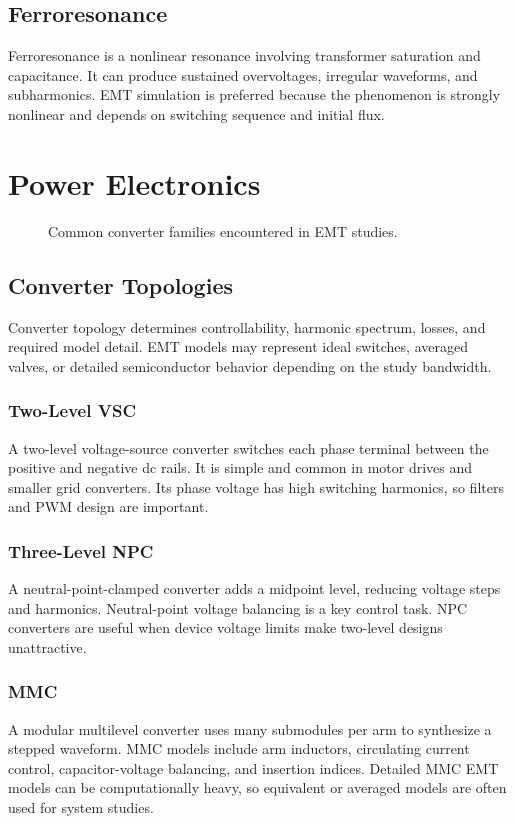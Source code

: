 \documentclass[11pt]{article}
\begin{document}
\subsection{Ferroresonance}
Ferroresonance is a nonlinear resonance involving transformer saturation and capacitance. It can produce sustained overvoltages, irregular waveforms, and subharmonics. EMT simulation is preferred because the phenomenon is strongly nonlinear and depends on switching sequence and initial flux.

\section{Power Electronics}
\begin{figure}[h]
\centering

\caption{Common converter families encountered in EMT studies.}
\end{figure}

\subsection{Converter Topologies}
Converter topology determines controllability, harmonic spectrum, losses, and required model detail. EMT models may represent ideal switches, averaged valves, or detailed semiconductor behavior depending on the study bandwidth.

\subsubsection{Two-Level VSC}
A two-level voltage-source converter switches each phase terminal between the positive and negative dc rails. It is simple and common in motor drives and smaller grid converters. Its phase voltage has high switching harmonics, so filters and PWM design are important.

\subsubsection{Three-Level NPC}
A neutral-point-clamped converter adds a midpoint level, reducing voltage steps and harmonics. Neutral-point voltage balancing is a key control task. NPC converters are useful when device voltage limits make two-level designs unattractive.

\subsubsection{MMC}
A modular multilevel converter uses many submodules per arm to synthesize a stepped waveform. MMC models include arm inductors, circulating current control, capacitor-voltage balancing, and insertion indices. Detailed MMC EMT models can be computationally heavy, so equivalent or averaged models are often used for system studies.
\end{document}
